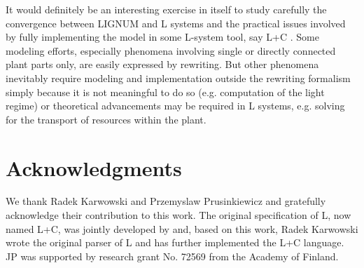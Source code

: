 It  would definitely  be an  interesting exercise  in itself  to study
carefully  the  convergence  between  LIGNUM  and L  systems  and  the
practical  issues involved  by fully  implementing the  model  in some
L-system tool,  say L+C \citep{karwowski:02}.   Some modeling efforts,
especially  phenomena  involving single  or  directly connected  plant
parts only,  are easily expressed  by rewriting.  But  other phenomena
inevitably require  modeling and implementation  outside the rewriting
formalism  simply  because  it  is  not  meaningful  to  do  so  (e.g.
computation of  the light regime)  or theoretical advancements  may be
required in  L systems, e.g.   solving for the transport  of resources
within the plant.

\section{Acknowledgments}

We thank  Radek Karwowski and Przemyslaw  Prusinkiewicz and gratefully
acknowledge   their   contribution  to   this   work.   The   original
specification  of   L,  now  named  L+C,  was   jointly  developed  by
\citet{pp:99a}  and, based  on this  work, Radek  Karwowski  wrote the
original parser of L and  has further implemented the L+C language. JP
was supported by research grant No. 72569 from the Academy of Finland.
 